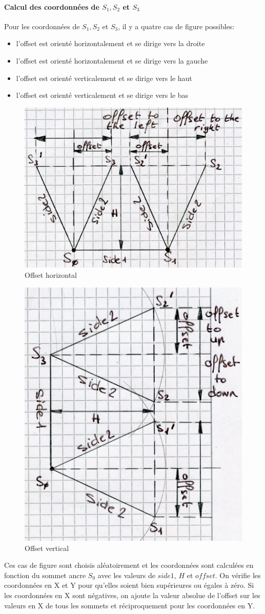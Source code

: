 \documentclass[a4paper, 12pt]{article}
\begin{document}
\paragraph{Calcul des coordonnées de $S_{1}, S_{2}$ et $S_{3}$}
Pour les coordonnées de $S_{1}, S_{2}$ et $S_{3}$, il y a quatre cas de figure possibles:
\begin{itemize}
\item l'offset est orienté horizontalement et se dirige vers la droite
\item l'offset est orienté horizontalement et se dirige vers la gauche
\item l'offset est orienté verticalement et se dirige vers le haut
\item l'offset est orienté verticalement et se dirige vers le bas
\end{itemize}
\begin{figure}[h!]
 \centering
 \includegraphics[width=0.3\linewidth]{includes/images/creaQCar5offsethoriz}
 \caption{Offset horizontal}
 \label{fig:creaqcar5offsethoriz}
\end{figure}
\begin{figure}[h!]
 \centering
 \includegraphics[width=0.3\linewidth]{includes/images/creaQCar6offsetverti}
 \caption{Offset vertical}
 \label{fig:creaqcar6offsetverti}
\end{figure}
Ces cas de figure sont choisis aléatoirement et les coordonnées sont calculées en fonction du sommet ancre $S_{0}$ avec les valeurs de $\mathit{side1}$, $H$ et $offset$. On vérifie les coordonnées en X et Y pour qu'elles soient bien supérieures ou égales à zéro. Si les coordonnées en X sont négatives, on ajoute la valeur absolue de l'offset sur les valeurs en X de tous les sommets et réciproquement pour les coordonnées en Y. 
\end{document}
